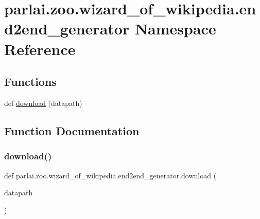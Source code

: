 \hypertarget{namespaceparlai_1_1zoo_1_1wizard__of__wikipedia_1_1end2end__generator}{}\section{parlai.\+zoo.\+wizard\+\_\+of\+\_\+wikipedia.\+end2end\+\_\+generator Namespace Reference}
\label{namespaceparlai_1_1zoo_1_1wizard__of__wikipedia_1_1end2end__generator}
\subsection*{Functions}
\begin{DoxyCompactItemize}
\item 
def \hyperlink{namespaceparlai_1_1zoo_1_1wizard__of__wikipedia_1_1end2end__generator_a3a34c992127ebe52eb1d98dcebbb4d47}{download} (datapath)
\end{DoxyCompactItemize}


\subsection{Function Documentation}
\mbox{\label{namespaceparlai_1_1zoo_1_1wizard__of__wikipedia_1_1end2end__generator_a3a34c992127ebe52eb1d98dcebbb4d47}} 
\subsubsection{\texorpdfstring{download()}{download()}}
{\footnotesize\ttfamily def parlai.\+zoo.\+wizard\+\_\+of\+\_\+wikipedia.\+end2end\+\_\+generator.\+download (\begin{DoxyParamCaption}\item[{}]{datapath }\end{DoxyParamCaption})}

